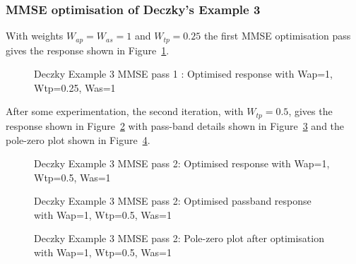 \documentclass[a4paper,twoside,10pt,english]{report}
\begin{document}
\subsubsection{MMSE optimisation of Deczky's Example 3}
With weights $W_{ap}=W_{as}=1$ and $W_{tp}=0.25$ the first MMSE optimisation
pass gives the response shown in Figure~\ref{fig:Deczky-Example-3-MMSE-x1}. 
\begin{figure}[!htbp]
\begin{center}
\scalebox{0.7}{}
\caption{Deczky Example 3 MMSE pass 1 : Optimised response with Wap=1, Wtp=0.25, Was=1}
\label{fig:Deczky-Example-3-MMSE-x1}
\end{center}
\end{figure}
After some experimentation, the second iteration, with $W_{tp}=0.5$, gives the 
response shown in Figure~\ref{fig:Deczky-Example-3-MMSE-x2} with pass-band 
details shown in Figure~\ref{fig:Deczky-Example-3-MMSE-x2-passband} and the 
pole-zero plot shown in Figure~\ref{fig:Deczky-Example-3-MMSE-x2-pz}.
\begin{figure}[!htbp]
\begin{center}
\scalebox{0.7}{}
\caption{Deczky Example 3 MMSE pass 2: Optimised response with Wap=1, Wtp=0.5, Was=1}
\label{fig:Deczky-Example-3-MMSE-x2}
\end{center}
\end{figure}
\begin{figure}[!htbp]
\begin{center}
\scalebox{0.7}{}
\caption{Deczky Example 3 MMSE pass 2: Optimised passband response with Wap=1, Wtp=0.5, Was=1}
\label{fig:Deczky-Example-3-MMSE-x2-passband}
\end{center}
\end{figure}
\begin{figure}[!htbp]
\begin{center}
\scalebox{0.7}{}
\caption{Deczky Example 3 MMSE pass 2: Pole-zero plot after optimisation with Wap=1, Wtp=0.5, Was=1}
\label{fig:Deczky-Example-3-MMSE-x2-pz}
\end{center}
\end{figure}
\end{document}
